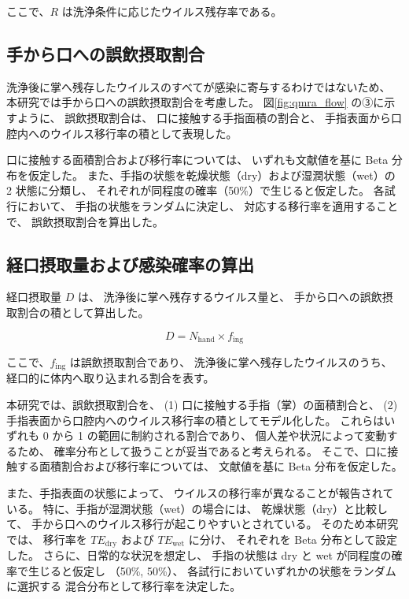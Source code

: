 ここで、$R$ は洗浄条件に応じたウイルス残存率である。

\subsection{手から口への誤飲摂取割合}

洗浄後に掌へ残存したウイルスのすべてが感染に寄与するわけではないため、
本研究では手から口への誤飲摂取割合を考慮した。
図\ref{fig:qmra_flow} の③に示すように、
誤飲摂取割合は、
口に接触する手指面積の割合と、
手指表面から口腔内へのウイルス移行率の積として表現した。

口に接触する面積割合および移行率については、
いずれも文献値を基に Beta 分布を仮定した。
また、手指の状態を乾燥状態（dry）および湿潤状態（wet）の
2 状態に分類し、
それぞれが同程度の確率（50\%）で生じると仮定した。
各試行において、
手指の状態をランダムに決定し、
対応する移行率を適用することで、
誤飲摂取割合を算出した。

\subsection{経口摂取量および感染確率の算出}

経口摂取量 $D$ は、
洗浄後に掌へ残存するウイルス量と、
手から口への誤飲摂取割合の積として算出した。

\begin{equation}
D = N_{\mathrm{hand}} \times f_{\mathrm{ing}}
\end{equation}

ここで、$f_{\mathrm{ing}}$ は誤飲摂取割合であり、
洗浄後に掌へ残存したウイルスのうち、
経口的に体内へ取り込まれる割合を表す。

本研究では、誤飲摂取割合を、
(1) 口に接触する手指（掌）の面積割合と、
(2) 手指表面から口腔内へのウイルス移行率の積としてモデル化した。
これらはいずれも 0 から 1 の範囲に制約される割合であり、
個人差や状況によって変動するため、
確率分布として扱うことが妥当であると考えられる。
そこで、口に接触する面積割合および移行率については、
文献値を基に Beta 分布を仮定した。

また、手指表面の状態によって、
ウイルスの移行率が異なることが報告されている。
特に、手指が湿潤状態（wet）の場合には、
乾燥状態（dry）と比較して、
手から口へのウイルス移行が起こりやすいとされている。
そのため本研究では、
移行率を $TE_{\mathrm{dry}}$ および $TE_{\mathrm{wet}}$ に分け、
それぞれを Beta 分布として設定した。
さらに、日常的な状況を想定し、
手指の状態は dry と wet が同程度の確率で生じると仮定し
（50\%, 50\%）、
各試行においていずれかの状態をランダムに選択する
混合分布として移行率を決定した。

